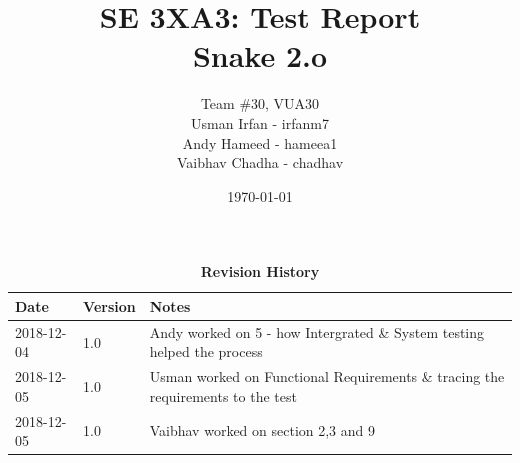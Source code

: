 \documentclass[12pt, titlepage]{article}
\title{SE 3XA3: Test Report\\Snake 2.o}
\author{Team \#30, VUA30
		\\ Usman Irfan - irfanm7
		\\ Andy Hameed - hameea1
		\\ Vaibhav Chadha - chadhav
}
\date{\today}
\begin{document}
\maketitle

\tableofcontents
\listoftables
\listoffigures

\begin{table}[bp]
\caption{\bf Revision History}
\begin{tabularx}{\textwidth}{p{3cm}p{2cm}X}
\toprule {\bf Date} & {\bf Version} & {\bf Notes}\\
\midrule
2018-12-04 & 1.0 & Andy worked on 5 - how Intergrated \& System testing helped the process \\
2018-12-05 & 1.0 & Usman worked on Functional Requirements \& tracing the requirements to the test \\
2018-12-05 & 1.0 & Vaibhav worked on section 2,3 and 9\\
\bottomrule
\end{tabularx}
\end{table}


\newpage

\end{document}
